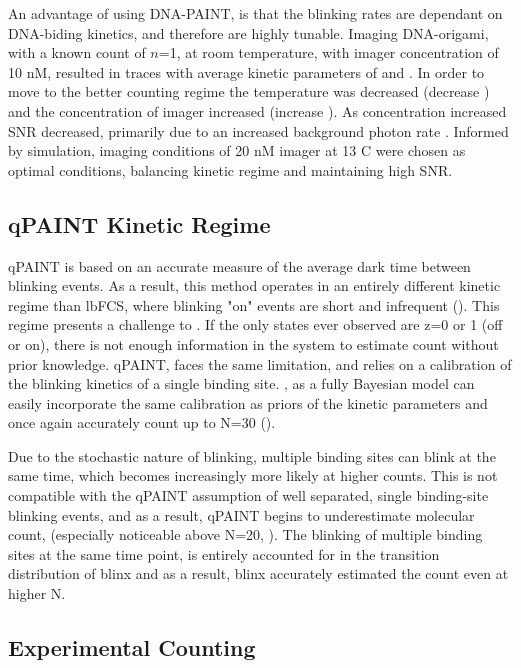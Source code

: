 An advantage of using DNA-PAINT, is that the blinking rates are dependant on DNA-biding kinetics,
	and therefore are highly tunable. %
	Imaging DNA-origami, with a known count of $n$=1, at room temperature, with imager concentration of 10 nM, 
	resulted in traces with average kinetic parameters of  and  . 
	In order to move to the better counting regime the temperature was decreased (decrease \poff) 
	and the concentration of imager increased (increase \pon).
	As concentration increased SNR decreased, primarily due to an increased background photon rate \rb.
	Informed by simulation, imaging conditions of 20 nM imager at 13 C were chosen as optimal conditions,
	balancing kinetic regime and maintaining high SNR.



\subsection{qPAINT Kinetic Regime}
qPAINT is based on an accurate measure of the average dark time between blinking events. 
	As a result, this method operates in an entirely different kinetic regime than lbFCS, where blinking 
	"on" events are short and infrequent ().
	This regime presents a challenge to \ours. If the only states ever observed are z=0 or 1 (off or on),
	there is not enough information in the system to estimate count without prior knowledge.
	qPAINT, faces the same limitation, and relies on a calibration of the blinking kinetics of a single binding site.
	\ours, as a fully Bayesian model can easily incorporate the same calibration as priors of the kinetic parameters
	and once again accurately count up to N=30 ().

Due to the stochastic nature of blinking, multiple binding sites can blink at the same time, 
	which becomes increasingly more likely at higher counts.
	This is not compatible with the qPAINT assumption of well separated, single binding-site blinking events, 
	and as a result, qPAINT begins to underestimate molecular count, (especially noticeable above N=20, ). 
	The blinking of multiple binding sites at the same time point, 
	is entirely accounted for in the transition distribution of blinx 
	and as a result, blinx accurately estimated the count even at higher N.
	


\subsection{Experimental Counting}
